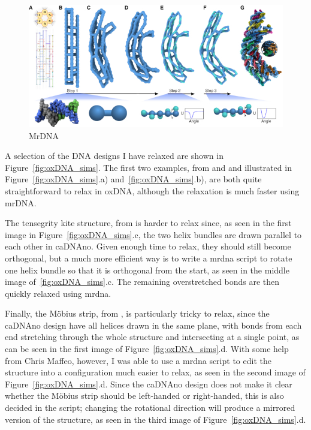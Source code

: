 \begin{figure}[ht]
  \begin{center}
    \includegraphics[width=\textwidth]{figures/mrDNA.jpg}
    \caption{MrDNA}
    \label{fig:mrdna}
  \end{center}
\end{figure}


A selection of the DNA designs I have relaxed are shown in Figure~\ref{fig:oxDNA_sims}. The first two examples, from \cite{gerling2015dynamic} and \cite{zadegan2012smallbox} and illustrated in Figure~\ref{fig:oxDNA_sims}.a) and~\ref{fig:oxDNA_sims}.b), are both quite straightforward to relax in oxDNA, although the relaxation is much faster using mrDNA.

The tensegrity kite structure, from \cite{liedl2010_kite} is harder to relax since, as seen in the first image in Figure~\ref{fig:oxDNA_sims}.c, the two helix bundles are drawn parallel to each other in caDNAno. Given enough time to relax, they should still become orthogonal, but a much more efficient way is to write a mrdna script to rotate one helix bundle so that it is orthogonal from the start, as seen in the middle image of~\ref{fig:oxDNA_sims}.c. The remaining overstretched bonds are then quickly relaxed using mrdna.

Finally, the Möbius strip, from \cite{han2010moebius}, is particularly tricky to relax, since the caDNAno design have all helices drawn in the same plane, with bonds from each end stretching through the whole structure and intersecting at a single point, as can be seen in the first image of Figure~\ref{fig:oxDNA_sims}.d. With some help from Chris Maffeo, however, I was able to use a mrdna script to edit the structure into a configuration much easier to relax, as seen in the second image of Figure~\ref{fig:oxDNA_sims}.d. Since the caDNAno design does not make it clear whether the Möbius strip should be left-handed or right-handed, this is also decided in the script; changing the rotational direction will produce a mirrored version of the structure, as seen in the third image of Figure~\ref{fig:oxDNA_sims}.d.

